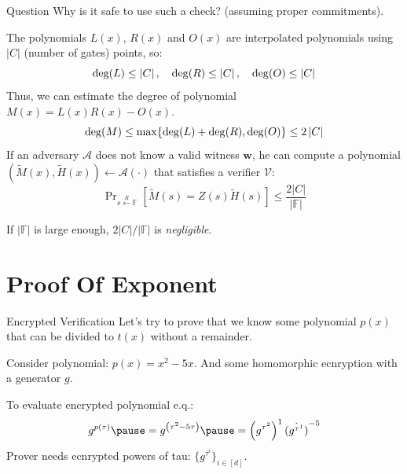 \documentclass{zkdl-presentation-template}
\begin{document}
    \begin{frame}
        \begin{alertblock}{Question}
            Why is it safe to use such a check? (assuming proper commitments).
        \end{alertblock}

        The polynomials $L(x)$, $R(x)$ and $O(x)$ are interpolated polynomials using 
        $\left| C \right|$ (number of gates) points, so:
        \vspace{-5pt}
        \begin{equation*}
            \deg(L) \le \left| C \right|, \quad
            \deg(R) \le \left| C \right|, \quad 
            \deg(O) \le \left| C \right|
            \vspace{-5pt}
        \end{equation*}
        \pause
        Thus, we can estimate the degree of polynomial $M(x) = L(x)R(x) - O(x)$.
        \vspace{-5pt}
        \begin{equation*}
            \deg(M) \leq \max\{\deg(L) + \deg(R), \deg(O)\} \leq 2 \left| C \right|
            \vspace{-5pt}
        \end{equation*}
        \pause
        If an adversary $\mathcal{A}$ does not know a valid witness $\mathbf{w}$, he can compute a
        polynomial $(\widetilde{M}(x), \widetilde{H}(x)) \gets \mathcal{A}(\cdot)$ that satisfies a verifier 
        $\mathcal{V}$:
        \vspace{-5pt}
        \begin{equation*}
            \mathop{\text{Pr}}_{s \xleftarrow{R} \mathbb{F}}[\widetilde{M}(s) = Z(s)\widetilde{H}(s)] \leq \frac{2 \left| C \right|}{|\mathbb{F}|}
        \end{equation*}

        If $|\mathbb{F}|$ is large enough, $2|C|/|\mathbb{F}|$ is \textit{negligible}.
    \end{frame}

    \section{Proof Of Exponent}

    \begin{frame}{Encrypted Verification}
        Let's try to prove that we know some polynomial $p(x)$ that can be divided to $t(x)$ without a 
        remainder.

        \pause
        Consider polynomial: $p(x) = x^2 - 5x$. \pause And some homomorphic ecnryption with a
        generator $g$.
        
        To evaluate encrypted polynomial e.q.:
        {\large
        \begin{equation*}
            g^{p(\tau)} \pause = g^{\left( \tau^2 - 5\tau \right)} \pause = \left( g^{\tau^2} \right)^1 \dot {\left( g^{\tau^1} \right)}^{-5}
        \end{equation*}}
        Prover needs ecnrypted powers of tau: $\{g^{\tau^i}\}_{i \in [d]}$.
    \end{frame}
\end{document}
